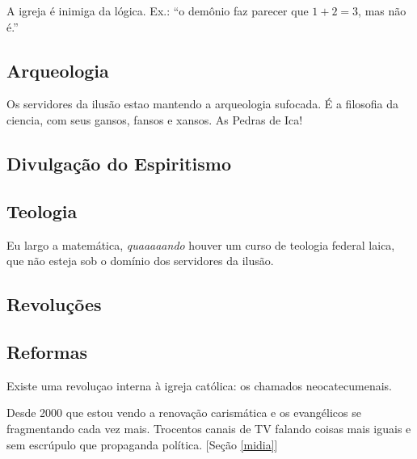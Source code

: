 \documentclass[12pt,a4paper]{article}
\begin{document}
			A igreja \'e inimiga da l\'ogica. Ex.: \textquotedblleft o dem\^onio faz parecer que $1 + 2 = 3$, mas n\~ao \'e.\textquotedblright

		\subsection{Arqueologia}
			\begin{flushright}
			\end{flushright}

			Os servidores da ilus\~ao estao mantendo a arqueologia sufocada. \'E a filosofia da ciencia, com seus gansos, fansos e xansos. As Pedras de Ica!

		\subsection{Divulga\c{c}\~ao do Espiritismo}
			\begin{flushright}
			\end{flushright}

		\subsection{Teologia}
			\begin{flushright}
			\end{flushright}

			Eu largo a matem\'atica, \emph{quaaaaando} houver um curso de teologia federal laica, que n\~ao esteja sob o dom\'inio dos servidores da ilus\~ao\cite{ilusao}.

		\subsection{Revolu\c{c}\~oes}
			\begin{flushright}
			\end{flushright}

		\subsection{Reformas}
			\begin{flushright}
			\end{flushright}

			Existe uma revolu\c{c}ao interna \`a igreja cat\'olica: os chamados neocatecumenais.

			Desde 2000 que estou vendo a renova\c{c}\~ao carism\'atica e os evang\'elicos se fragmentando cada vez mais. Trocentos canais de TV falando coisas mais iguais e sem escr\'upulo que propaganda pol\'itica. [Se\c{c}\~ao \ref{midia}]
\end{document}
